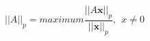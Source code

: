 \documentclass[12 pt]{slides}
\begin{document}
\begingroup
\[||A||_p = maximum\frac{||A\textbf{x}||_p}{||\textbf{x}||_p},\ \ x \ne 0\]
\endgroup
\end{document}
